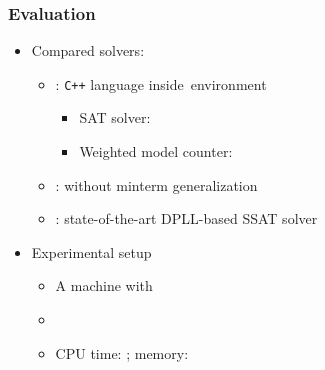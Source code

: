 \newcommand{\nrandom}{\num{700}}
\newcommand{\napplication}{\num{120}}
\newcommand{\nstrategic}{\num{60}}
\newcommand{\npec}{\num{60}}

\begin{frame}
    \frametitle{Evaluation}
    \begin{itemize}
        \item Compared solvers:
              \pause
              \begin{itemize}
                  \item \ressat: \texttt{C++} language inside~\abc environment~\cite{ABC}
                        \pause
                        \begin{itemize}
                            \item SAT solver: ~\cite{Een2003Solver}
                                  \pause
                            \item Weighted model counter: \cachet~\cite{Sang2004}
                                  \pause
                        \end{itemize}
                  \item \ressatb: \ressat without minterm generalization
                        \pause
                  \item \dcssat: state-of-the-art DPLL-based SSAT solver
                        \pause
              \end{itemize}
        \item Experimental setup
              \pause
              \begin{itemize}
                  \item A machine with~\machineSpec
                        \pause
                  \item \osInfo
                        \pause
                  \item CPU time: \timelimit; memory: \memlimit
              \end{itemize}
    \end{itemize}
\end{frame}

